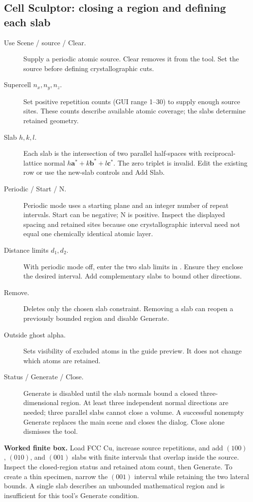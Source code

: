 \subsection{Cell Sculptor: closing a region and defining each slab}
\begin{description}
\item[Use Scene / source / Clear.] Supply a periodic atomic source. Clear removes it from the tool. Set the source before defining crystallographic cuts.
\item[Supercell $n_x,n_y,n_z$.] Set positive repetition counts (GUI range 1--30) to supply enough source sites. These counts describe available atomic coverage; the slabs determine retained geometry.
\item[Slab $h,k,l$.] Each slab is the intersection of two parallel half-spaces with reciprocal-lattice normal $h\mathbf a^*+k\mathbf b^*+l\mathbf c^*$. The zero triplet is invalid. Edit the existing row or use the new-slab controls and Add Slab.
\item[Periodic / Start / N.] Periodic mode uses a starting plane and an integer number of repeat intervals. Start can be negative; N is positive. Inspect the displayed spacing and retained sites because one crystallographic interval need not equal one chemically identical atomic layer.
\item[Distance limits $d_1,d_2$.] With periodic mode off, enter the two slab limits in \angstrom. Ensure they enclose the desired interval. Add complementary slabs to bound other directions.
\item[Remove.] Deletes only the chosen slab constraint. Removing a slab can reopen a previously bounded region and disable Generate.
\item[Outside ghost alpha.] Sets visibility of excluded atoms in the guide preview. It does not change which atoms are retained.
\item[Status / Generate / Close.] Generate is disabled until the slab normals bound a closed three-dimensional region. At least three independent normal directions are needed; three parallel slabs cannot close a volume. A successful nonempty Generate replaces the main scene and closes the dialog. Close alone dismisses the tool.
\end{description}
\textbf{Worked finite box.} Load FCC Cu, increase source repetitions, and add $(100)$, $(010)$, and $(001)$ slabs with finite intervals that overlap inside the source. Inspect the closed-region status and retained atom count, then Generate. To create a thin specimen, narrow the $(001)$ interval while retaining the two lateral bounds. A single slab describes an unbounded mathematical region and is insufficient for this tool's Generate condition.

